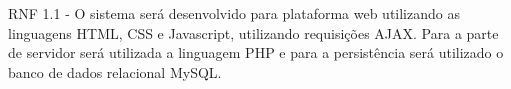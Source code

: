 \documentclass[12pt,a4paper,onecolumn,titlepage]{article}
\begin{document}
\begin{description}
\item RNF 1.1 - O sistema será desenvolvido para plataforma web utilizando as  linguagens HTML, CSS e Javascript, utilizando requisições AJAX. Para
		a parte de servidor será utilizada a linguagem PHP e para a persistência
		será utilizado o banco de dados relacional MySQL.


\end{description}




  
  

\newpage

\renewcommand{\contentsname}{Índice}



%
%
\end{document}
